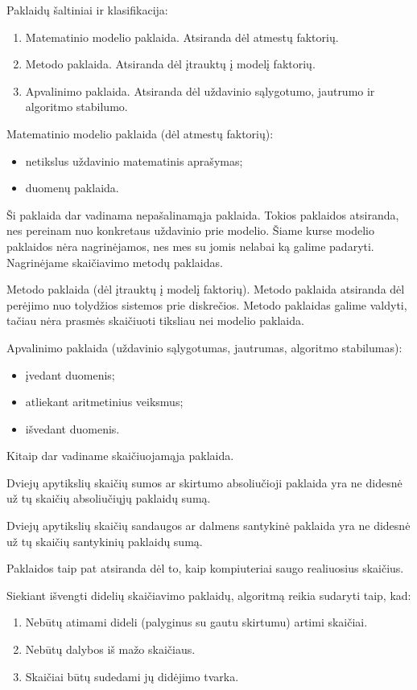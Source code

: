 Paklaidų šaltiniai ir klasifikacija:
\begin{enumerate}
  \item Matematinio modelio paklaida. Atsiranda dėl atmestų faktorių.
  \item Metodo paklaida. Atsiranda dėl įtrauktų į modelį faktorių.
  \item Apvalinimo paklaida. Atsiranda dėl uždavinio sąlygotumo, jautrumo
    ir algoritmo stabilumo.
\end{enumerate}

Matematinio modelio paklaida (dėl atmestų faktorių):
\begin{itemize}
  \item netikslus uždavinio matematinis aprašymas;
  \item duomenų paklaida.
\end{itemize}
Ši paklaida dar vadinama nepašalinamąja paklaida. Tokios paklaidos
atsiranda, nes pereinam nuo konkretaus uždavinio prie modelio. Šiame
kurse modelio paklaidos nėra nagrinėjamos, nes mes su jomis nelabai
ką galime padaryti. Nagrinėjame skaičiavimo metodų paklaidas.

Metodo paklaida (dėl įtrauktų į modelį faktorių). Metodo paklaida
atsiranda dėl perėjimo nuo tolydžios sistemos prie diskrečios.
Metodo paklaidas galime valdyti, tačiau nėra prasmės skaičiuoti
tiksliau nei modelio paklaida.

Apvalinimo paklaida (uždavinio sąlygotumas, jautrumas, algoritmo stabilumas):
\begin{itemize}
  \item įvedant duomenis;
  \item atliekant aritmetinius veiksmus;
  \item išvedant duomenis.
\end{itemize}
Kitaip dar vadiname skaičiuojamąja paklaida.

\begin{prop}
  Dviejų apytikslių skaičių sumos ar skirtumo absoliučioji paklaida yra ne
  didesnė už tų skaičių absoliučiųjų paklaidų sumą.
\end{prop}
\begin{prop}
  Dviejų apytikslių skaičių sandaugos ar dalmens santykinė paklaida yra ne
  didesnė už tų skaičių santykinių paklaidų sumą.
\end{prop}

Paklaidos taip pat atsiranda dėl to, kaip kompiuteriai saugo
realiuosius skaičius.

Siekiant išvengti didelių skaičiavimo paklaidų, algoritmą reikia sudaryti
taip, kad:
\begin{enumerate}
  \item Nebūtų atimami dideli (palyginus su gautu skirtumu) artimi skaičiai.
  \item Nebūtų dalybos iš mažo skaičiaus.
  \item Skaičiai būtų sudedami jų didėjimo tvarka.
\end{enumerate}

